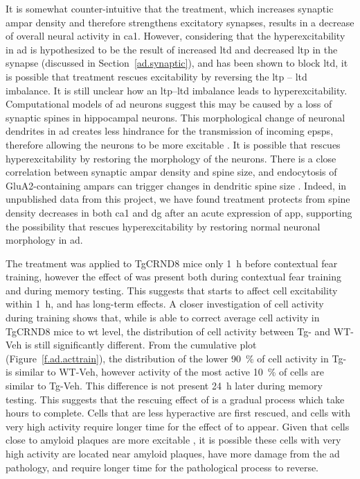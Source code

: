 It is somewhat counter-intuitive that the \tglu{} treatment, which increases synaptic \gls{ampar} density and therefore strengthens excitatory synapses, results in a decrease of overall neural activity in \gls{ca1}. However, considering that the hyperexcitability in \gls{ad} is hypothesized to be the result of increased \gls{ltd} and decreased \gls{ltp} in the synapse (discussed in Section~\ref{ad.synaptic}), and \tglu{} has been shown to block \gls{ltd}, it is possible that \tglu{} treatment rescues excitability by reversing the \gls{ltp} -- \gls{ltd} imbalance. It is still unclear how an \gls{ltp}--\gls{ltd} imbalance leads to hyperexcitability. Computational models of \gls{ad} neurons suggest this may be caused by a loss of synaptic spines in hippocampal neurons. This morphological change of neuronal dendrites in \gls{ad} creates less hindrance for the transmission of incoming \glspl{epsp}, therefore allowing the neurons to be more excitable \citep{siskova14}. It is possible that \tglu{} rescues hyperexcitability by restoring the morphology of the neurons. There is a close correlation between synaptic \gls{ampar} density and spine size, and endocytosis of GluA2-containing \glspl{ampar} can trigger changes in dendritic spine size \citep{hanley08}. Indeed, in unpublished data from this project, we have found \tglu{} treatment protects from spine density decreases in both \gls{ca1} and \gls{dg} after an acute expression of \gls{app}, supporting the possibility that \tglu{} rescues hyperexcitability by restoring normal neuronal morphology in \gls{ad}. 

The \tglu{} treatment was applied to TgCRND8 mice only \SI{1}{\hour} before contextual fear training, however the effect of \tglu{} was present both during contextual fear training and during memory testing. This suggests that \tglu{} starts to affect cell excitability within \SI{1}{\hour}, and has long-term effects. A closer investigation of cell activity during training shows that, while \tglu{} is able to correct average cell activity in TgCRND8 mice to \gls{wt} level, the distribution of cell activity between Tg-\tglu{} and WT-Veh is still significantly different. From the cumulative plot (Figure~\ref{f.ad.acttrain}), the distribution of the lower \SI{90}{\percent} of cell activity in Tg-\tglu{} is similar to WT-Veh, however activity of the most active \SI{10}{\percent} of cells are similar to Tg-Veh. This difference is not present \SI{24}{\hour} later during memory testing. This suggests that the rescuing effect of \tglu{} is a gradual process which take hours to complete. Cells that are less hyperactive are first rescued, and cells with very high activity require longer time for the effect of \tglu{} to appear. Given that cells close to amyloid plaques are more excitable \citep{busche12}, it is possible these cells with very high activity are located near amyloid plaques, have more damage from the \gls{ad} pathology, and require longer time for the pathological process to reverse. 


